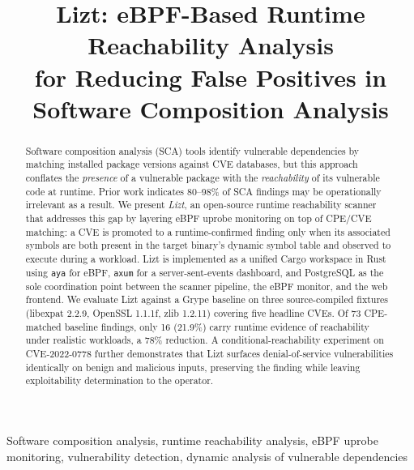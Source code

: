 \documentclass[conference]{IEEEtran}
\begin{document}

\title{Lizt: eBPF-Based Runtime Reachability Analysis\\
for Reducing False Positives in Software Composition Analysis}

\author{%
}

\maketitle

\begin{abstract}
  Software composition analysis (SCA) tools identify vulnerable dependencies by matching installed package versions against CVE
  databases, but this approach conflates the \emph{presence} of a
  vulnerable package with the \emph{reachability} of its vulnerable
  code at runtime. Prior work indicates 80--98\% of SCA findings may
  be operationally irrelevant as a result. We present \textit{Lizt},
  an open-source runtime reachability scanner that addresses this
  gap by layering eBPF uprobe monitoring on top of CPE/CVE matching:
  a CVE is promoted to a runtime-confirmed finding only when its
  associated symbols are both present in the target binary's dynamic
  symbol table and observed to execute during a workload. Lizt is
  implemented as a unified Cargo workspace in Rust using \texttt{aya}
  for eBPF, \texttt{axum} for a server-sent-events dashboard, and
  PostgreSQL as the sole coordination point between the scanner
  pipeline, the eBPF monitor, and the web frontend. We evaluate Lizt
  against a Grype baseline on three source-compiled fixtures
  (libexpat 2.2.9, OpenSSL 1.1.1f, zlib 1.2.11) covering five
  headline CVEs. Of 73 CPE-matched baseline findings, only 16 (21.9\%)
  carry runtime evidence of reachability under realistic workloads, a
  78\% reduction. A conditional-reachability experiment on
  CVE-2022-0778 further demonstrates that Lizt surfaces
  denial-of-service vulnerabilities identically on benign and
  malicious inputs, preserving the finding while leaving exploitability
  determination to the operator.
\end{abstract}


\begin{IEEEkeywords}
Software composition analysis, runtime reachability analysis,
eBPF uprobe monitoring, vulnerability detection,
dynamic analysis of vulnerable dependencies
\end{IEEEkeywords}
\end{document}
